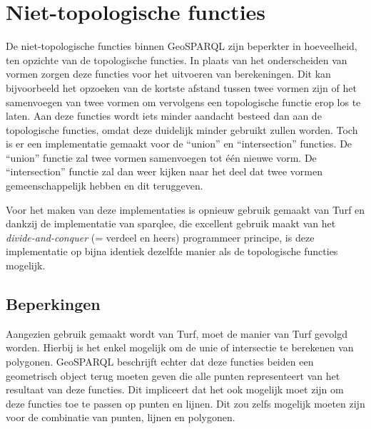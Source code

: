 \section{Niet-topologische functies}
\label{sec:niet_topologische_functies}
De niet-topologische functies binnen GeoSPARQL zijn beperkter in hoeveelheid, ten opzichte van de topologische functies. In plaats van het onderscheiden van vormen zorgen deze functies voor het uitvoeren van berekeningen. Dit kan bijvoorbeeld het opzoeken van de kortste afstand tussen twee vormen zijn of het samenvoegen van twee vormen om vervolgens een topologische functie erop los te laten. Aan deze functies wordt iets minder aandacht besteed dan aan de topologische functies, omdat deze duidelijk minder gebruikt zullen worden. Toch is er een implementatie gemaakt voor de ``union'' en ``intersection'' functies. De ``union'' functie zal twee vormen samenvoegen tot één nieuwe vorm. De ``intersection'' functie zal dan weer kijken naar het deel dat twee vormen gemeenschappelijk hebben en dit teruggeven. 

Voor het maken van deze implementaties is opnieuw gebruik gemaakt van Turf en dankzij de implementatie van sparqlee, die excellent gebruik maakt van het \textit{divide-and-conquer} (= verdeel en heers) programmeer principe, is deze implementatie op bijna identiek dezelfde manier als de topologische functies mogelijk.

\subsection{Beperkingen}
Aangezien gebruik gemaakt wordt van Turf, moet de manier van Turf gevolgd worden. Hierbij is het enkel mogelijk om de unie of intersectie te berekenen van polygonen. GeoSPARQL beschrijft echter dat deze functies beiden een geometrisch object terug moeten geven die alle punten representeert van het resultaat van deze functies. Dit impliceert dat het ook mogelijk moet zijn om deze functies toe te passen op punten en lijnen. Dit zou zelfs mogelijk moeten zijn voor de combinatie van punten, lijnen en polygonen.


